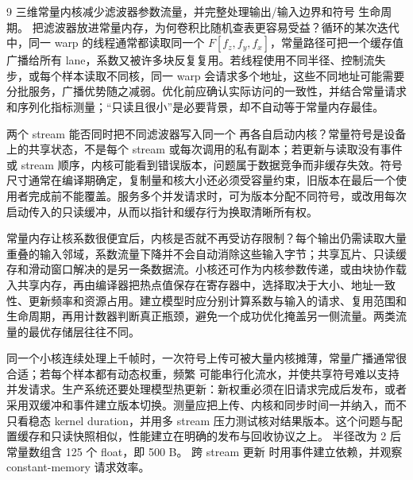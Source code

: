 \begin{solutionexercise}{9}
\conclusionheading 三维常量内核减少滤波器参数流量，并完整处理输出/输入边界和符号
生命周期。
\discussionheading
{}
把滤波器放进常量内存，为何卷积比随机查表更容易受益？循环的某次迭代中，同一 warp 的线程通常都读取同一个 $F[f_z,f_y,f_x]$，常量路径可把一个缓存值广播给所有 lane，系数又被许多块反复复用。若线程使用不同半径、控制流失步，或每个样本读取不同核，同一 warp 会请求多个地址，这些不同地址可能需要分批服务，广播优势随之减弱。优化前应确认实际访问的一致性，并结合常量请求和序列化指标测量；“只读且很小”是必要背景，却不自动等于常量内存最佳。

两个 stream 能否同时把不同滤波器写入同一个  再各自启动内核？常量符号是设备上的共享状态，不是每个 stream 或每次调用的私有副本；若更新与读取没有事件或 stream 顺序，内核可能看到错误版本，问题属于数据竞争而非缓存失效。符号尺寸通常在编译期确定，复制量和核大小还必须受容量约束，旧版本在最后一个使用者完成前不能覆盖。服务多个并发请求时，可为版本分配不同符号，或改用每次启动传入的只读缓冲，从而以指针和缓存行为换取清晰所有权。

常量内存让核系数很便宜后，内核是否就不再受访存限制？每个输出仍需读取大量重叠的输入邻域，系数流量下降并不会自动消除这些输入字节；共享瓦片、只读缓存和滑动窗口解决的是另一条数据流。小核还可作为内核参数传递，或由块协作载入共享内存，再由编译器把热点值保存在寄存器中，选择取决于大小、地址一致性、更新频率和资源占用。建立模型时应分别计算系数与输入的请求、复用范围和生命周期，再用计数器判断真正瓶颈，避免一个成功优化掩盖另一侧流量。两类流量的最优存储层往往不同。

同一个小核连续处理上千帧时，一次符号上传可被大量内核摊薄，常量广播通常很合适；若每个样本都有动态权重，频繁  可能串行化流水，并使共享符号难以支持并发请求。生产系统还要处理模型热更新：新权重必须在旧请求完成后发布，或者采用双缓冲和事件建立版本切换。测量应把上传、内核和同步时间一并纳入，而不只看稳态 kernel duration，并用多 stream 压力测试核对结果版本。这个问题与配置缓存和只读快照相似，性能建立在明确的发布与回收协议之上。
\variantheading 半径改为 2 后常量数组含 125 个 float，即 500 B。
\practiceheading 跨 stream 更新  时用事件建立依赖，并观察 constant-memory 请求效率。
\end{solutionexercise}

